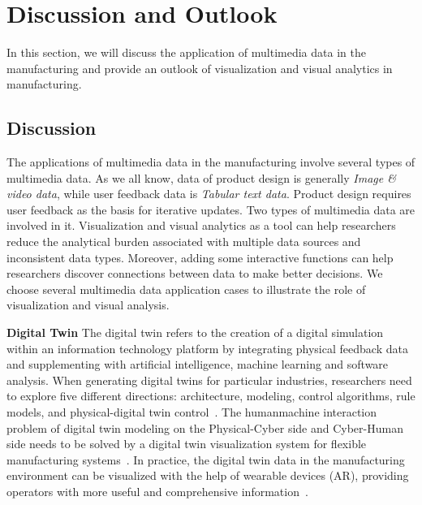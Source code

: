 \documentclass[a4paper,fleqn]{cas-dc}
\begin{document}
\section{Discussion and Outlook}
In this section, we will discuss the application of multimedia data in the manufacturing and provide an outlook of visualization and visual analytics in manufacturing.
\subsection{Discussion}
The applications of multimedia data in the manufacturing involve several types of multimedia data.
As we all know, data of product design is generally \textit{Image \& video data}, while user feedback data is \textit{Tabular text data}. Product design requires user feedback as the basis for iterative updates. Two types of multimedia data are involved in it.
Visualization and visual analytics as a tool can help researchers reduce the analytical burden associated with multiple data sources and inconsistent data types.
Moreover, adding some interactive functions can help researchers discover connections between data to make better decisions.
We choose several multimedia data application cases to illustrate the role of visualization and visual analysis.

\textbf{Digital Twin}
The digital twin refers to the creation of a digital simulation within an information technology platform by integrating physical feedback data and supplementing with artificial intelligence, machine learning and software analysis. When generating digital twins for particular industries, researchers need to explore five different directions: architecture, modeling, control algorithms, rule models, and physical-digital twin control~\cite{lei2021toward}. The humanmachine interaction problem of digital twin modeling on the Physical-Cyber side and Cyber-Human side needs to be solved by a digital twin visualization system for flexible manufacturing systems~\cite{Fan2021}. In practice, the digital twin data in the manufacturing environment can be visualized with the help of wearable devices (AR), providing operators with more useful and comprehensive information~\cite{Zhu2019}.
\end{document}
